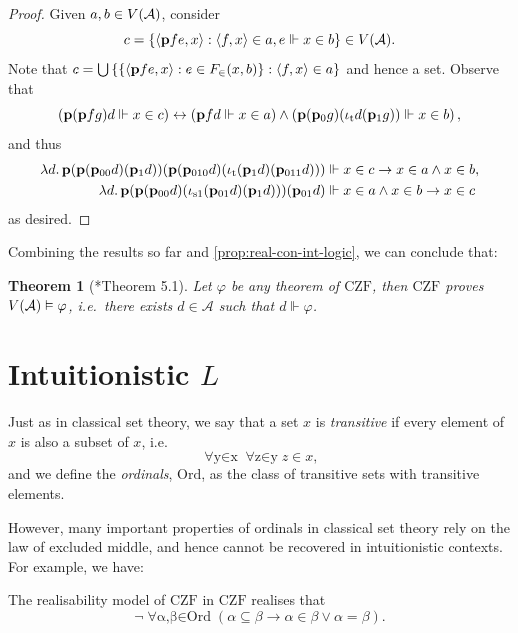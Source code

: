 \documentclass[12pt,openany]{book}
\makeatletter
\newcommand\inds[1]{\index{C@Set theory!#1}}
\theoremstyle{plain}
\newtheorem{theorem}{Theorem}[section]
\theoremstyle{definition}
\newcommand\tuple[1]{\left\langle #1 \right\rangle}
\newcommand\opA[1]{\mathop{\forall #1}}
\newcommand\oplam[1]{\mathop{\lambda #1.}}
\newcommand\CZF{\mathrm{CZF}}
\newcommand\Ord{\mathrm{Ord}}
\newcommand\bp{\mathbf{p}}
\newcommand\iot{\iota_\textup{t}}
\newcommand\ioso{\iota_\textup{s1}}
\makeatother
\begin{document}
\begin{proof}
  Given $a, b \in V\mleft(\mathcal{A}\mright)$, consider
  \[c = \left\{\tuple{\bp fe, x} : \tuple{f, x} \in a, e \Vdash x \in b\right\} \in V\mleft(\mathcal{A}\mright).\]
  Note that $c = \bigcup \left\{\left\{\tuple{\bp fe, x} : e \in F_\in\mleft(x, b\mright)\right\} : \tuple{f, x} \in a\right\}$ and hence a set. Observe that
  \[\left(\bp \mleft(\bp fg\mright) d \Vdash x \in c\right) \leftrightarrow \left(\bp fd \Vdash x \in a\right) \land \left(\bp \mleft(\bp_0 g\mright) \mleft(\iot d \mleft(\bp_1 g\mright)\mright) \Vdash x \in b\right),\]
  and thus
  \begin{align*}
    \oplam{d} \bp \mleft(\bp \mleft(\bp_{00} d\mright) \mleft(\bp_1 d\mright)\mright) \mleft(\bp \mleft(\bp_{010} d\mright) \mleft(\iot \mleft(\bp_1 d\mright) \mleft(\bp_{011} d\mright)\mright)\mright) & \Vdash x \in c \rightarrow x \in a \land x \in b, \\
    \oplam{d} \bp \mleft(\bp \mleft(\bp_{00} d\mright) \mleft(\ioso \mleft(\bp_{01} d\mright) \mleft(\bp_1 d\mright)\mright)\mright) \mleft(\bp_{01} d\mright)                                            & \Vdash x \in a \land x \in b \rightarrow x \in c
  \end{align*}
  as desired.
\end{proof}

Combining the results so far and \autoref{prop:real-con-int-logic}, we can conclude that:
\begin{theorem}[\cite{rathjen06-czf-realizability}*{Theorem 5.1}]
  Let $\varphi$ be any theorem of $\CZF$, then $\CZF$ proves $V\mleft(\mathcal{A}\mright) \vDash \varphi$, i.e.\ there exists $d \in \mathcal{A}$ such that $d \Vdash \varphi$.
\end{theorem}

\section{Intuitionistic \texorpdfstring{$L$}{L}}
\label{sec:intro-int-l}

Just as in classical set theory, we say that a set $x$ is \emph{transitive} if every element of $x$ is also a subset of $x$, i.e.
\[\opA{y \in x} \opA{z \in y} z \in x,\]
and we define the \emph{ordinals}, $\Ord$\inds{ordinals, $\Ord$}, as the class of transitive sets with transitive elements.

However, many important properties of ordinals in classical set theory rely on the law of excluded middle, and hence cannot be recovered in intuitionistic contexts. For example, we have:
\begin{lemma}
  \label{lem:ord-trichotomy-fail}
  The realisability model of $\CZF$ in $\CZF$ realises that
  \[\neg\!\opA{\alpha, \beta \in \Ord} \left(\alpha \subseteq \beta \rightarrow \alpha \in \beta \lor \alpha = \beta\right).\]
\end{lemma}
\end{document}
